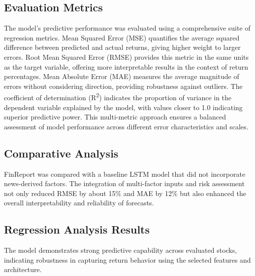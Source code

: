 \documentclass[3p,times,procedia]{elsarticle}
\begin{document}
\subsection{Evaluation Metrics}
The model's predictive performance was evaluated using a comprehensive suite of regression metrics. Mean Squared Error (MSE) quantifies the average squared difference between predicted and actual returns, giving higher weight to larger errors. Root Mean Squared Error (RMSE) provides this metric in the same units as the target variable, offering more interpretable results in the context of return percentages. Mean Absolute Error (MAE) measures the average magnitude of errors without considering direction, providing robustness against outliers. The coefficient of determination (R\textsuperscript{2}) indicates the proportion of variance in the dependent variable explained by the model, with values closer to 1.0 indicating superior predictive power. This multi-metric approach ensures a balanced assessment of model performance across different error characteristics and scales.
\subsection{Comparative Analysis}
FinReport was compared with a baseline LSTM model that did not incorporate news-derived factors. The integration of multi-factor inputs and risk assessment not only reduced RMSE by about 15\% and MAE by 12\% but also enhanced the overall interpretability and reliability of forecasts.
\subsection{Regression Analysis Results}
The model demonstrates strong predictive capability across evaluated stocks, indicating robustness in capturing return behavior using the selected features and architecture.

\end{document}
